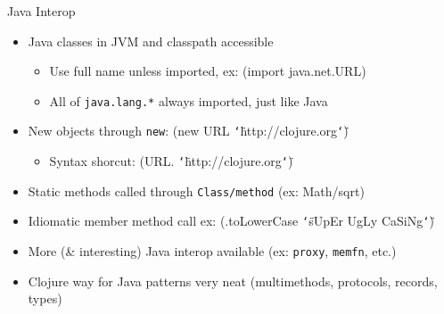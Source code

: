 \documentclass{beamer}
\renewcommand{\textquotedbl}{\texttt{\char`\"}}
\begin{document}
\begin{frame}{Java Interop}
  \begin{itemize}
  \item Java classes in JVM and classpath accessible
    \begin{itemize}
    \item Use full name unless imported, ex: {\ttfamily\color{black}
%
\textcolor[rgb]{0.54901963,0.54901963,0.54901963}{(}\textcolor[rgb]{0.49803922,0.0,0.49803922}{import}
{\textquotesingle}\textcolor[rgb]{0.28235295,0.23921569,0.54509807}{java.net.URL}\textcolor[rgb]{0.54901963,0.54901963,0.54901963}{)}}
    \item All of \texttt{java.lang.*} always imported, just like Java
    \end{itemize}
  \item New objects through \texttt{new}: {\ttfamily\color{black}
%
\textcolor[rgb]{0.54901963,0.54901963,0.54901963}{(}new
\textcolor[rgb]{0.28235295,0.23921569,0.54509807}{URL}
\textcolor[rgb]{0.54509807,0.13333334,0.32156864}{{\textquotedbl}http://clojure.org{\textquotedbl}}\textcolor[rgb]{0.54901963,0.54901963,0.54901963}{)}}
    \begin{itemize}
    \item Syntax shorcut: {\ttfamily\color{black}
\textcolor[rgb]{0.54901963,0.54901963,0.54901963}{(}\textcolor[rgb]{0.28235295,0.23921569,0.54509807}{URL.}
\textcolor[rgb]{0.54509807,0.13333334,0.32156864}{{\textquotedbl}http://clojure.org{\textquotedbl}}\textcolor[rgb]{0.54901963,0.54901963,0.54901963}{)}}
    \end{itemize}
  \item Static methods called through \texttt{Class/method} (ex: {\ttfamily\color[rgb]{0.28235295,0.23921569,0.54509807}
Math/sqrt})
  \item Idiomatic member method call ex: {\ttfamily\color{black}
\textcolor[rgb]{0.54901963,0.54901963,0.54901963}{(}\textcolor[rgb]{0.28235295,0.23921569,0.54509807}{.toLowerCase}
\textcolor[rgb]{0.54509807,0.13333334,0.32156864}{{\textquotedbl}sUpEr
UgLy
CaSiNg{\textquotedbl}}\textcolor[rgb]{0.54901963,0.54901963,0.54901963}{)}}
  \item More (\& interesting) Java interop available (ex:
    \texttt{proxy}, \texttt{memfn}, etc.)
  \item Clojure way for Java patterns very neat (multimethods, protocols, records, types)
  \end{itemize}
\end{frame}
\end{document}

